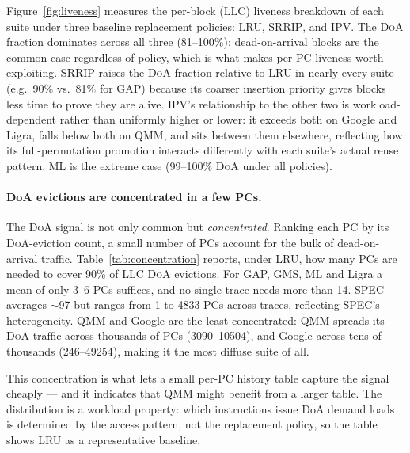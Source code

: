 \documentclass[conference]{IEEEtran}
\newcommand{\srrip}{\textsc{SRRIP}\xspace}
\newcommand{\ipv}{\textsc{IPV}\xspace}
\newcommand{\lru}{\textsc{LRU}\xspace}
\newcommand{\doa}{\textsc{DoA}\xspace}
\newcommand{\llc}{\textsc{LLC}\xspace}
\begin{document}
Figure~\ref{fig:liveness} measures the per-block (\llc) liveness breakdown of
each suite under three baseline replacement policies: \lru, \srrip, and \ipv.
The \doa fraction dominates across all three (81--100\%): dead-on-arrival blocks
are the common case regardless of policy, which is what makes per-PC liveness
worth exploiting. \srrip raises the \doa fraction relative to \lru in nearly
every suite (e.g.\ 90\% vs.\ 81\% for GAP) because its coarser insertion
priority gives blocks less time to prove they are alive. \ipv's relationship
to the other two is workload-dependent rather than uniformly higher or lower:
it exceeds both on Google and Ligra, falls below both on QMM, and sits between
them elsewhere, reflecting how its full-permutation promotion interacts
differently with each suite's actual reuse pattern. ML is the extreme case
(99--100\% \doa under all policies).

\paragraph{DoA evictions are concentrated in a few PCs.}
The \doa signal is not only common but \emph{concentrated}. Ranking each PC by its
\doa-eviction count, a small number of PCs account for the bulk of dead-on-arrival
traffic. Table~\ref{tab:concentration} reports, under \lru, how many PCs
are needed to cover 90\% of LLC \doa evictions. For GAP, GMS, ML and Ligra a mean of
only 3--6 PCs suffices, and no single trace needs more than 14. SPEC averages
$\sim$97 but ranges from 1 to 4833 PCs across traces, reflecting SPEC's
heterogeneity. QMM and Google are the least concentrated: QMM spreads its \doa
traffic across thousands of PCs (3090--10504), and Google across tens of
thousands (246--49254), making it the most diffuse suite of all.

This concentration is what lets a small per-\textsc{PC} history table capture
the signal cheaply --- and it indicates that QMM might benefit from a larger table.
The distribution is a workload property: which instructions issue DoA demand loads is
determined by the access pattern, not the replacement policy, so the table shows 
\lru as a representative baseline.
\end{document}
